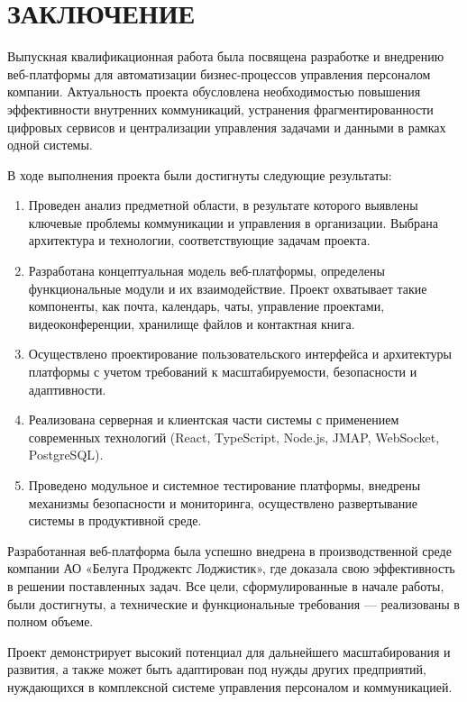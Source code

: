 \section*{ЗАКЛЮЧЕНИЕ}

Выпускная квалификационная работа была посвящена разработке и внедрению веб-платформы для автоматизации бизнес-процессов управления персоналом компании. Актуальность проекта обусловлена необходимостью повышения эффективности внутренних коммуникаций, устранения фрагментированности цифровых сервисов и централизации управления задачами и данными в рамках одной системы.

В ходе выполнения проекта были достигнуты следующие результаты:

\begin{enumerate}
\item Проведен анализ предметной области, в результате которого выявлены ключевые проблемы коммуникации и управления в организации. Выбрана архитектура и технологии, соответствующие задачам проекта.
\item Разработана концептуальная модель веб-платформы, определены функциональные модули и их взаимодействие. Проект охватывает такие компоненты, как почта, календарь, чаты, управление проектами, видеоконференции, хранилище файлов и контактная книга.
\item Осуществлено проектирование пользовательского интерфейса и архитектуры платформы с учетом требований к масштабируемости, безопасности и адаптивности.
\item Реализована серверная и клиентская части системы с применением современных технологий (React, TypeScript, Node.js, JMAP, WebSocket, PostgreSQL).
\item Проведено модульное и системное тестирование платформы, внедрены механизмы безопасности и мониторинга, осуществлено развертывание системы в продуктивной среде.
\end{enumerate}

Разработанная веб-платформа была успешно внедрена в производственной среде компании АО «Белуга Проджектс Лоджистик», где доказала свою эффективность в решении поставленных задач. Все цели, сформулированные в начале работы, были достигнуты, а технические и функциональные требования — реализованы в полном объеме.

Проект демонстрирует высокий потенциал для дальнейшего масштабирования и развития, а также может быть адаптирован под нужды других предприятий, нуждающихся в комплексной системе управления персоналом и коммуникацией.